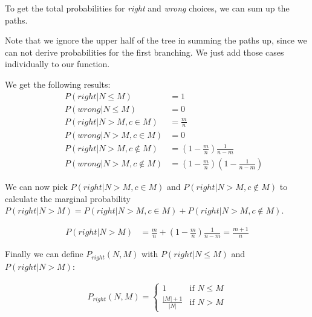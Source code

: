 To get the total probabilities for \textit{right} and \textit{wrong} choices, we 
can sum up the paths.

Note that we ignore the upper half of the tree in summing the paths up, since we 
can not derive probabilities for the first branching. We just add those cases 
individually to our function.

We get the following results:
\begin{align*}
&&P(right | N \leq M) &= 1 \\
&&P(wrong | N \leq M) &= 0 \\
&&P(right | N > M, c \in M) &= \frac{m}{n} \\
&&P(wrong | N > M, c \in M) &= 0 \\
&&P(right | N > M, c \notin M) &= \left(1 - \frac{m}{n}\right) \frac{1}{n-m} \\
&&P(wrong | N > M, c \notin M) &= \left(1 - \frac{m}{n}\right) \left(1 - \frac{1}{n-m}\right)
\end{align*}

We can now pick $P(right | N > M, c \in M)$ and $P(right | N > M, c \notin M)$ to 
calculate the marginal probability $P(right | N > M) = P(right | N > M, c \in M) + P(right | N > M, c \notin M)$.

\begin{align*}
P(right | N > M) &= \frac{m}{n} + (1 - \frac{m}{n}) \frac{1}{n - m} = \frac{m + 1}{n}
\end{align*}

Finally we can define $P_{right}(N, M)$ with $P(right | N \leq M)$ and $P(right | N > M)$:

\begin{align*}
P_{right}(N, M) = 
\begin{cases} 
1             & \mbox{if } N \leq M \\ 
\frac{|M|+1}{|N|} & \mbox{if } N > M
\end{cases}
\end{align*}
